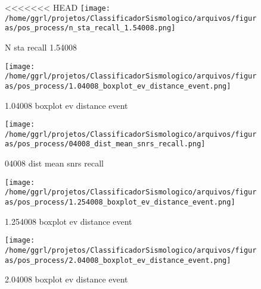                     \begin{figure}[H]
                        \centering
<<<<<<< HEAD
                        \texttt{[image: /home/ggrl/projetos/ClassificadorSismologico/arquivos/figuras/pos\_process/n\_sta\_recall\_1.54008.png]}
                        \caption{N sta recall 1.54008}
                        \label{fig:n_sta_recall_1.54008}
                    \end{figure}
                

                    \begin{figure}[H]
                        \centering
                        \texttt{[image: /home/ggrl/projetos/ClassificadorSismologico/arquivos/figuras/pos\_process/1.04008\_boxplot\_ev\_distance\_event.png]}
                        \caption{1.04008 boxplot ev distance event}
                        \label{fig:1.04008_boxplot_ev_distance_event}
                    \end{figure}
                

                    \begin{figure}[H]
                        \centering
                        \texttt{[image: /home/ggrl/projetos/ClassificadorSismologico/arquivos/figuras/pos\_process/04008\_dist\_mean\_snrs\_recall.png]}
                        \caption{04008 dist mean snrs recall}
                        \label{fig:04008_dist_mean_snrs_recall}
                    \end{figure}
                

                    \begin{figure}[H]
                        \centering
                        \texttt{[image: /home/ggrl/projetos/ClassificadorSismologico/arquivos/figuras/pos\_process/1.254008\_boxplot\_ev\_distance\_event.png]}
                        \caption{1.254008 boxplot ev distance event}
                        \label{fig:1.254008_boxplot_ev_distance_event}
                    \end{figure}
                

                    \begin{figure}[H]
                        \centering
                        \texttt{[image: /home/ggrl/projetos/ClassificadorSismologico/arquivos/figuras/pos\_process/2.04008\_boxplot\_ev\_distance\_event.png]}
                        \caption{2.04008 boxplot ev distance event}
                        \label{fig:2.04008_boxplot_ev_distance_event}
                    \end{figure}
                


